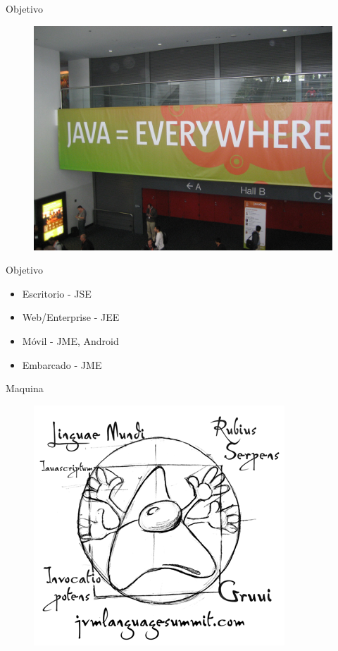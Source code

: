 \documentclass{beamer}
\begin{document}
\begin{frame}{Objetivo}
	\begin{figure}
		\centering
		\includegraphics[width=\linewidth]{Images/everywhere}
	\end{figure}
\end{frame}

\begin{frame}{Objetivo}
	\begin{itemize}
		\item Escritorio - JSE
		\item Web/Enterprise - JEE
		\item Móvil - JME, Android
		\item Embarcado - JME
	\end{itemize}
\end{frame}

\begin{frame}{Maquina}
	\begin{figure}
		\centering
		\includegraphics[width=0.7\linewidth]{Images/DukeVitru}
	\end{figure}
\end{frame}
\end{document}
